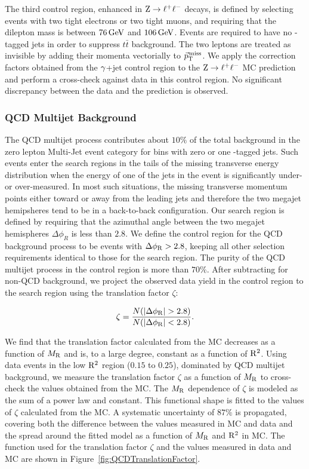 The third control region, enhanced in $\mathrm{Z}\to\ell^+\ell^-$ decays, 
is defined by selecting events with two tight electrons or two tight muons, and requiring that the dilepton mass is
between $76\,\text{Ge\hspace{-.08em}V}$ and $106\,\text{Ge\hspace{-.08em}V}$. Events are required to have no \PQb-tagged jets
in order to suppress $t\bar{t}$ background. The two leptons are treated as invisible by adding their
momenta vectorially to ${\vec p}_{\mathrm{T}}^{\kern1pt\text{miss}}$. We apply the correction factors obtained from the
$\gamma$+jet control region to the $\mathrm{Z}\to\ell^+\ell^-$ MC prediction and perform a cross-check against data
in this control region. No significant discrepancy between the data and the prediction is observed.

\subsubsection{QCD Multijet Background}
\label{sec:QCDCR}
The QCD multijet process contributes about $10\%$ of the total background in the zero lepton Multi-Jet
event category for bins with zero or one \PQb-tagged jets. Such events enter the search regions
in the tails of the missing transverse energy distribution when the energy of 
one of the jets in the event is significantly under- or over-measured. 
In most such situations, the missing transverse momentum points either toward
or away from the leading jets and therefore the two megajet hemipsheres tend to
be in a back-to-back configuration. Our search region is defined by requiring that
the azimuthal angle between the two megajet hemispheres $\Delta\phi_R$ is less than
$2.8$. We define the control region for the QCD background process to be events
with $\Delta\phi_\mathrm{R}>2.8$, keeping all other selection requirements identical to those for
the search region. The purity of the QCD multijet process in the control region
is more than $70\%$. After subtracting for non-QCD background,
we project the observed data yield in the control region to the search region using
the translation factor $\zeta$:

\begin{equation}
\zeta = \frac{N(|\dPhiR|>2.8)}{N(|\dPhiR|<2.8)}.
\end{equation}

We find that the translation factor calculated from the MC
decreases as a function of $M_\mathrm{R}$ and is, to a large degree, constant as a function of $\mathrm{R}^2$.
Using data events in the low $\mathrm{R}^2$ region ($0.15$ to $0.25$), dominated
by QCD multijet background, we measure the translation factor $\zeta$ as a function of
$M_\mathrm{R}$ to cross-check the values obtained from the MC.
The $M_\mathrm{R}$ dependence of $\zeta$ is modeled as the sum of a power law and constant.  
This functional shape is fitted to the values of $\zeta$ calculated from the MC.
A systematic uncertainty of $87\%$ is propagated, covering both the difference
between the values measured in MC and data and the spread around the
fitted model as a function of $M_\mathrm{R}$ and $\mathrm{R}^2$ in MC. The function used
for the translation factor $\zeta$ and the values measured in data and MC are
shown in Figure~\ref{fig:QCDTranslationFactor}. 

